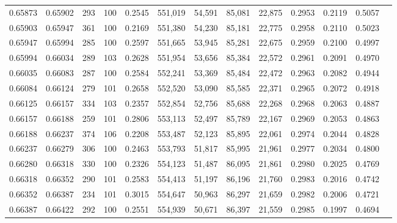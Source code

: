 \begin{tabular}{rrrrrrrrrrrrr}
0.65873 & 0.65902 &   293 & 100 &                                     0.2545 & 551,019 &  54,591 &  85,081 &  22,875 & 0.2953 & 0.2119 & 0.5057 \\
0.65903 & 0.65947 &   361 & 100 &                                     0.2169 & 551,380 &  54,230 &  85,181 &  22,775 & 0.2958 & 0.2110 & 0.5023 \\
0.65947 & 0.65994 &   285 & 100 &                                     0.2597 & 551,665 &  53,945 &  85,281 &  22,675 & 0.2959 & 0.2100 & 0.4997 \\
0.65994 & 0.66034 &   289 & 103 &                                     0.2628 & 551,954 &  53,656 &  85,384 &  22,572 & 0.2961 & 0.2091 & 0.4970 \\
0.66035 & 0.66083 &   287 & 100 &                                     0.2584 & 552,241 &  53,369 &  85,484 &  22,472 & 0.2963 & 0.2082 & 0.4944 \\
0.66084 & 0.66124 &   279 & 101 &                                     0.2658 & 552,520 &  53,090 &  85,585 &  22,371 & 0.2965 & 0.2072 & 0.4918 \\
0.66125 & 0.66157 &   334 & 103 &                                     0.2357 & 552,854 &  52,756 &  85,688 &  22,268 & 0.2968 & 0.2063 & 0.4887 \\
0.66157 & 0.66188 &   259 & 101 &                                     0.2806 & 553,113 &  52,497 &  85,789 &  22,167 & 0.2969 & 0.2053 & 0.4863 \\
0.66188 & 0.66237 &   374 & 106 &                                     0.2208 & 553,487 &  52,123 &  85,895 &  22,061 & 0.2974 & 0.2044 & 0.4828 \\
0.66237 & 0.66279 &   306 & 100 &                                     0.2463 & 553,793 &  51,817 &  85,995 &  21,961 & 0.2977 & 0.2034 & 0.4800 \\
0.66280 & 0.66318 &   330 & 100 &                                     0.2326 & 554,123 &  51,487 &  86,095 &  21,861 & 0.2980 & 0.2025 & 0.4769 \\
0.66318 & 0.66352 &   290 & 101 &                                     0.2583 & 554,413 &  51,197 &  86,196 &  21,760 & 0.2983 & 0.2016 & 0.4742 \\
0.66352 & 0.66387 &   234 & 101 &                                     0.3015 & 554,647 &  50,963 &  86,297 &  21,659 & 0.2982 & 0.2006 & 0.4721 \\
0.66387 & 0.66422 &   292 & 100 &                                     0.2551 & 554,939 &  50,671 &  86,397 &  21,559 & 0.2985 & 0.1997 & 0.4694 \\

\end{tabular}
